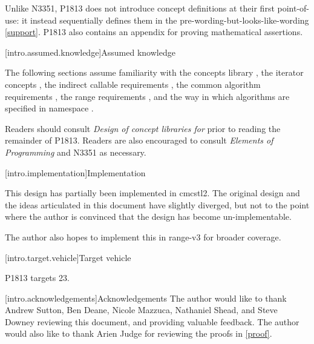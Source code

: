 Unlike N3351, P1813 does not introduce concept definitions at their first point-of-use: it instead
sequentially defines them in the pre-wording-but-looks-like-wording \ref{support}. P1813 also
contains an appendix for proving mathematical assertions.

[intro.assumed.knowledge]{Assumed knowledge}

The following sections assume familiarity with the concepts library , the
iterator concepts , the indirect callable requirements
, the common algorithm requirements , the range
requirements , and the way in which algorithms are specified in namespace
 .

Readers should consult \textit{Design of concept libraries for \Cpp{}}\cite{concept-design} prior to
reading the remainder of P1813. Readers are also encouraged to consult \textit{Elements of
Programming}\cite{EoP} and N3351 as necessary.

[intro.implementation]{Implementation}

This design has partially been implemented in cmcstl2. The original design and the ideas articulated
in this document have slightly diverged, but not to the point where the author is convinced that the
design has become un-implementable.

The author also hopes to implement this in range-v3 for broader coverage.

[intro.target.vehicle]{Target vehicle}

P1813 targets \Cpp{}23.

[intro.acknowledgements]{Acknowledgements}
The author would like to thank Andrew Sutton, Ben Deane, Nicole Mazzuca, Nathaniel Shead, and Steve
Downey reviewing this document, and providing valuable feedback. The author would also like to thank
Arien Judge for reviewing the proofs in \ref{proof}.
